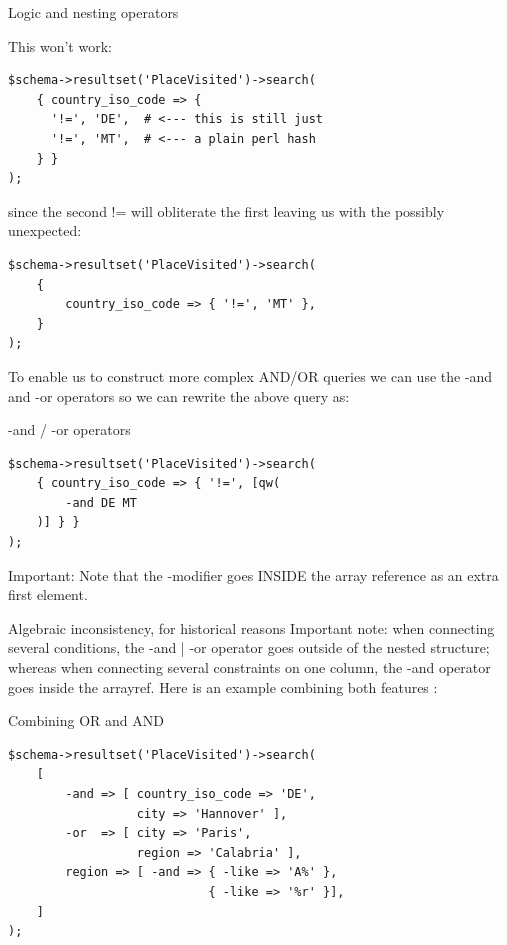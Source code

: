 \begin{frame}[fragile]{Logic and nesting operators}

This won't work:

\begin{lstlisting}
$schema->resultset('PlaceVisited')->search(
    { country_iso_code => {
      '!=', 'DE',  # <--- this is still just
      '!=', 'MT',  # <--- a plain perl hash
    } }
);
\end{lstlisting}

since the second != will obliterate the first leaving us with the possibly
unexpected:

\begin{lstlisting}
$schema->resultset('PlaceVisited')->search(
    {
        country_iso_code => { '!=', 'MT' },
    }
);
\end{lstlisting}
\end{frame}

To enable us to construct more complex AND/OR queries we can use the -and and -or operators so we can rewrite the above query as:

\begin{frame}[fragile]{-and / -or operators}
\begin{lstlisting}
$schema->resultset('PlaceVisited')->search(
    { country_iso_code => { '!=', [qw(
        -and DE MT
    )] } }
);
\end{lstlisting}
\end{frame}

Important: Note that the -modifier goes INSIDE the array reference as an extra first element. 

Algebraic inconsistency, for historical reasons
Important note: when connecting several conditions, the -and | -or operator goes outside of the nested structure; whereas when connecting several constraints on one column, the -and operator goes inside the arrayref. Here is an example combining both features :

\begin{frame}[fragile]{Combining OR and AND}

\begin{lstlisting}
$schema->resultset('PlaceVisited')->search(
    [
        -and => [ country_iso_code => 'DE', 
                  city => 'Hannover' ],
        -or  => [ city => 'Paris', 
                  region => 'Calabria' ],
        region => [ -and => { -like => 'A%' }, 
                            { -like => '%r' }],
    ]
);
\end{lstlisting}
\end{frame}

